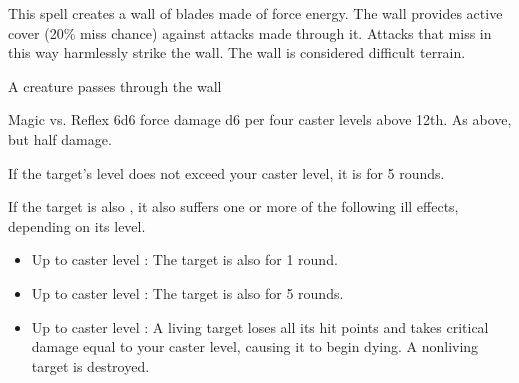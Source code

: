 \begin{spellheader}
    \spelldur{\durshort \dismissable}
\end{spellheader}
\begin{spelleffects}
    \spelleffect This spell creates a wall of blades made of force energy. The wall provides active cover (20\% miss chance) against attacks made through it. Attacks that miss in this way harmlessly strike the wall. The wall is considered difficult terrain.
    \begin{spelltrigger}{A creature passes through the wall}
        \begin{spellattack}{Magic vs. Reflex}
            \spellsuccess 6d6 force damage \add d6 per four caster levels above 12th.
            \spellfailure As above, but half damage.
        \end{spellattack}
    \end{spelltrigger}
\end{spelleffects}
\begin{spellfooter}

\end{spellfooter}

\begin{spellheader}
\end{spellheader}
\begin{spelleffects}
    \spelleffect If the target's level does not exceed your caster level, it is \sickened for 5 rounds.

    If the target is also \bloodied, it also suffers one or more of the following ill effects, depending on its level.
    \begin{itemize}
        \item Up to caster level : The target is also \nauseated for 1 round.
        \item Up to caster level : The target is also \paralyzed for 5 rounds.
        \item Up to caster level : A living target loses all its hit points and takes critical damage equal to your caster level, causing it to begin dying. A nonliving target is destroyed.
    \end{itemize}
\end{spelleffects}
\begin{spellfooter}

\end{spellfooter}

